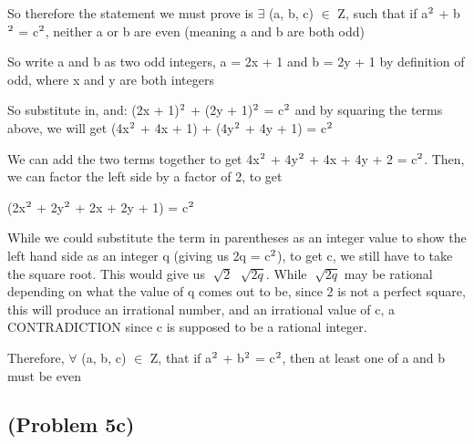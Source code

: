 \documentclass{article}
\begin{document}
\par\vspace{0.5cm}\noindent So therefore the statement we must prove is $\exists$ (a, b, c) $\in$ Z, such that if a$\textsuperscript{2}$ + b$\textsuperscript{2}$ = c$\textsuperscript{2}$, neither a or b are even (meaning a and b are both odd)

\par\vspace{0.5cm}\noindent So write a and b as two odd integers, a = 2x + 1 and b = 2y + 1 by definition of odd, where x and y are both integers

\par\vspace{0.5cm}\noindent So substitute in, and: (2x + 1)$\textsuperscript{2}$ + (2y + 1)$\textsuperscript{2}$ = c$\textsuperscript{2}$ and by squaring the terms above, we will get (4x$\textsuperscript{2}$ + 4x + 1) + (4y$\textsuperscript{2}$ + 4y + 1) = c$\textsuperscript{2}$

\par\vspace{0.5cm}\noindent We can add the two terms together to get 4x$\textsuperscript{2}$ + 4y$\textsuperscript{2}$ + 4x + 4y + 2 = c$\textsuperscript{2}$.  Then, we can factor the left side by a factor of 2, to get
\par{}(2x$\textsuperscript{2}$ + 2y$\textsuperscript{2}$ + 2x + 2y + 1) = c$\textsuperscript{2}$

\par\vspace{0.5cm}\noindent While we could substitute the term in parentheses as an integer value to show the left hand side as an integer q (giving us 2q = c$\textsuperscript{2}$), to get c, we still have to take the square root.  This would give us $\sqrt[]{2}$ $\sqrt[]{2q}$.  While $\sqrt[]{2q}$ may be rational depending on what the value of q comes out to be, since 2 is not a perfect square, this will produce an irrational number, and an irrational value of c, a CONTRADICTION since c is supposed to be a rational integer.

\par\vspace{0.5cm}\noindent Therefore, $\forall$ (a, b, c) $\in$ Z, that if a$\textsuperscript{2}$ + b$\textsuperscript{2}$ = c$\textsuperscript{2}$, then at least one of a and b must be even

\subsection{(Problem 5c)}
\end{document}
